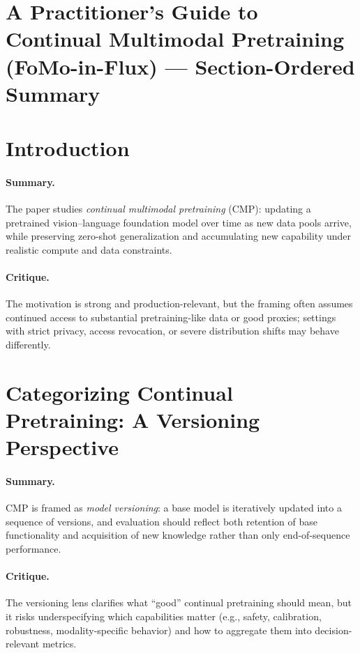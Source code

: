 \documentclass[12pt]{article}
\begin{document}
\psetheader %

\section*{A Practitioner's Guide to Continual Multimodal Pretraining (FoMo-in-Flux) --- Section-Ordered Summary}

\section{Introduction}
\paragraph{Summary.} The paper studies \emph{continual multimodal pretraining} (CMP): updating a pretrained
vision--language foundation model over time as new data pools arrive, while preserving zero-shot
generalization and accumulating new capability under realistic compute and data constraints.
\paragraph{Critique.} The motivation is strong and production-relevant, but the framing often assumes
continued access to substantial pretraining-like data or good proxies; settings with strict privacy, access
revocation, or severe distribution shifts may behave differently.

\section{Categorizing Continual Pretraining: A Versioning Perspective}
\paragraph{Summary.} CMP is framed as \emph{model versioning}: a base model is iteratively updated into a
sequence of versions, and evaluation should reflect both retention of base functionality and acquisition of
new knowledge rather than only end-of-sequence performance.
\paragraph{Critique.} The versioning lens clarifies what “good” continual pretraining should mean, but it
risks underspecifying which capabilities matter (e.g., safety, calibration, robustness, modality-specific
behavior) and how to aggregate them into decision-relevant metrics.
\end{document}

